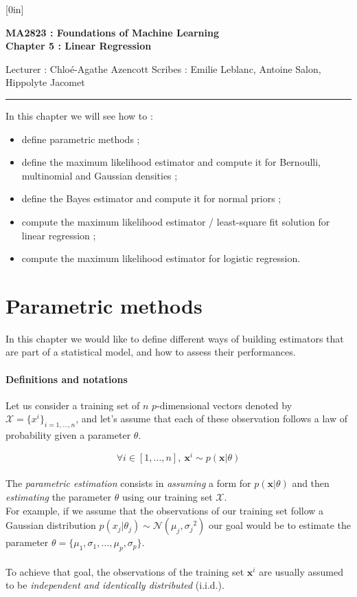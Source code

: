 \documentclass[a4paper,12pt]{article}
\newcommand{\xx}{{\bm x}}
\begin{document}
\raisebox{0.6in}[0in]{}
\vspace{-0.7in}

\begin{center}
\bf\large MA2823 : Foundations of Machine Learning \\
Chapter 5 : Linear Regression
\end{center}

\noindent
Lecturer : Chlo\'e-Agathe Azencott   
\hfill
Scribes : Emilie Leblanc, Antoine Salon, Hippolyte Jacomet 

\noindent
\rule{\textwidth}{1pt}

\medskip

In this chapter we will see how to :
\begin{itemize}
\item define parametric methods ;
\item define the maximum likelihood estimator and compute it
for Bernoulli, multinomial and Gaussian densities ;
\item define the Bayes estimator and compute it for normal
priors ;
\item compute the maximum likelihood estimator / least-square
fit solution for linear regression ;
\item compute the maximum likelihood estimator for logistic
regression.
\end{itemize}

\section{Parametric methods}

In this chapter we would like to define different ways of building estimators that are part of a statistical model, and how to assess their performances.

\paragraph{Definitions and notations} Let us consider a training set of $n$ $p$-dimensional vectors denoted by $\mathcal{X}=\{x^i\}_{i=1,\dots,n}$, and let's assume that each of these observation follows a law of probability given a parameter $\theta$. 

\[
\forall i \in [1,\dots,n],\ \xx^{i}\sim{}p(\xx|\theta)
\]\\
The {\em parametric estimation} consists in {\em assuming} a form for $p(\xx|\theta)$ and then {\em estimating} the parameter $\theta$ using our training set $\mathcal{X}$. \\
For example, if we assume that the observations of our training set follow a Gaussian distribution $p(x_{j}|\theta_j)\sim{}\mathcal{N}(\mu_j,{\sigma_j}^2)$ our goal would be to estimate the parameter $\theta=\{\mu_1,\sigma_1,\dots,\mu_p,\sigma_p\}$. \\
\\
To achieve that goal, the observations of the training set $\xx^i$ are usually assumed to be {\em independent and identically distributed} (i.i.d.). \\
\end{document}
